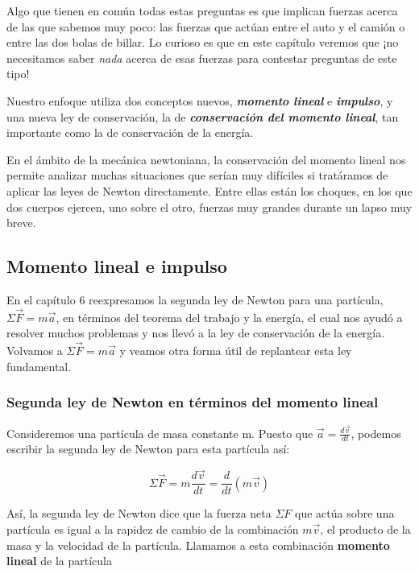 \documentclass{article}
\newcommand{\newsubsection}[1]{
    \vspace{0.5cm}
    \color{sectionColor}
    \subsection{ #1}
    \color{black}
    \vspace{0.5cm}
}
\newcommand{\newtitle}[1]{
    \color{titleColor}
    \subsubsection{\textbf{#1}}
    \color{black}
}
\newcommand{\bl}[1]{\textbf{#1}}
\begin{document}
    \par Algo que tienen en común todas estas preguntas es que implican fuerzas acerca de las que sabemos muy poco: las fuerzas que actúan entre el auto y el camión o entre las dos bolas de billar. Lo curioso es que en este capítulo veremos que ¡no necesitamos saber \textit{nada} acerca de esas fuerzas para contestar preguntas de este tipo!

    \vspace{0.3cm}

    \par Nuestro enfoque utiliza dos conceptos nuevos, \textit{\bl{momento lineal}} e \textit{\bl{impulso}}, y una nueva ley de conservación, la de \textit{\bl{conservación del momento lineal}}, tan importante como la de conservación de la energía. 
    
    \par En el ámbito de la mecánica newtoniana, la conservación del momento lineal nos permite analizar muchas situaciones que serían muy difíciles si tratáramos de aplicar las leyes de Newton directamente. Entre ellas están los choques, en los que dos cuerpos ejercen, uno sobre el otro, fuerzas muy grandes durante un lapso muy breve.

    \newsubsection{Momento lineal e impulso}

    \par En el capítulo 6 reexpresamos la segunda ley de Newton para una partícula, $\Sigma \vec{F} = m \vec{a}$, en términos del teorema del trabajo y la energía, el cual nos ayudó a resolver muchos problemas y nos llevó a la ley de conservación de la energía. Volvamos a $\Sigma \vec{F} = m \vec{a}$ y veamos otra forma útil de replantear esta ley fundamental.

    \newtitle{Segunda ley de Newton en términos del momento lineal}

    \par Consideremos una partícula de masa constante m. Puesto que $\vec{a} = \frac{d \vec{v}}{dt}$, podemos escribir la segunda ley de Newton para esta partícula así:

    \[ \Sigma \vec{F} = m \frac{d \vec{v}}{dt} = \frac{d}{dt} \left( m \vec{v} \right) \]

    \par Así, la segunda ley de Newton dice que la fuerza neta $\Sigma F$ que actúa sobre una partícula es igual a la rapidez de cambio de la combinación $m \vec{v}$, el producto de la masa y la velocidad de la partícula. Llamamos a esta combinación \bl{momento lineal} de la partícula
\end{document}
